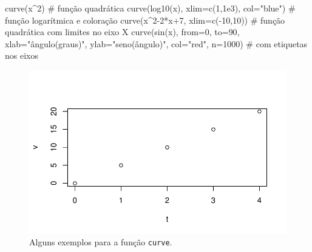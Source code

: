 \documentclass[
  letterpaper,
  DIV=11,
  numbers=noendperiod]{scrreprt}
\newenvironment{Shaded}{\begin{snugshade}}{\end{snugshade}}
\newcommand{\AttributeTok}[1]{\textcolor[rgb]{0.40,0.45,0.13}{#1}}
\newcommand{\CommentTok}[1]{\textcolor[rgb]{0.37,0.37,0.37}{#1}}
\newcommand{\DecValTok}[1]{\textcolor[rgb]{0.68,0.00,0.00}{#1}}
\newcommand{\FloatTok}[1]{\textcolor[rgb]{0.68,0.00,0.00}{#1}}
\newcommand{\FunctionTok}[1]{\textcolor[rgb]{0.28,0.35,0.67}{#1}}
\newcommand{\NormalTok}[1]{\textcolor[rgb]{0.00,0.23,0.31}{#1}}
\newcommand{\SpecialCharTok}[1]{\textcolor[rgb]{0.37,0.37,0.37}{#1}}
\newcommand{\StringTok}[1]{\textcolor[rgb]{0.13,0.47,0.30}{#1}}
\begin{document}
\begin{Shaded}
\begin{Highlighting}[]
\FunctionTok{curve}\NormalTok{(x}\SpecialCharTok{\^{}}\DecValTok{2}\NormalTok{) }\CommentTok{\# função quadrática}
\FunctionTok{curve}\NormalTok{(}\FunctionTok{log10}\NormalTok{(x), }\AttributeTok{xlim=}\FunctionTok{c}\NormalTok{(}\DecValTok{1}\NormalTok{,}\FloatTok{1e3}\NormalTok{), }\AttributeTok{col=}\StringTok{"blue"}\NormalTok{) }\CommentTok{\# função logarítmica e coloração}
\FunctionTok{curve}\NormalTok{(x}\SpecialCharTok{\^{}}\DecValTok{2{-}2}\SpecialCharTok{*}\NormalTok{x}\SpecialCharTok{+}\DecValTok{7}\NormalTok{, }\AttributeTok{xlim=}\FunctionTok{c}\NormalTok{(}\SpecialCharTok{{-}}\DecValTok{10}\NormalTok{,}\DecValTok{10}\NormalTok{)) }\CommentTok{\# função quadrática com limites no eixo X}
\FunctionTok{curve}\NormalTok{(}\FunctionTok{sin}\NormalTok{(x), }\AttributeTok{from=}\DecValTok{0}\NormalTok{, }\AttributeTok{to=}\DecValTok{90}\NormalTok{, }
      \AttributeTok{xlab=}\StringTok{"ângulo(graus)"}\NormalTok{, }\AttributeTok{ylab=}\StringTok{"seno(ângulo)"}\NormalTok{, }\AttributeTok{col=}\StringTok{"red"}\NormalTok{, }\AttributeTok{n=}\DecValTok{1000}\NormalTok{) }\CommentTok{\# com etiquetas nos eixos}
\end{Highlighting}
\end{Shaded}

\begin{figure}[H]

{\centering \includegraphics{basico_files/figure-pdf/unnamed-chunk-11-1.pdf}

}

\caption{Alguns exemplos para a função \texttt{curve}.}

\end{figure}%
\end{document}
